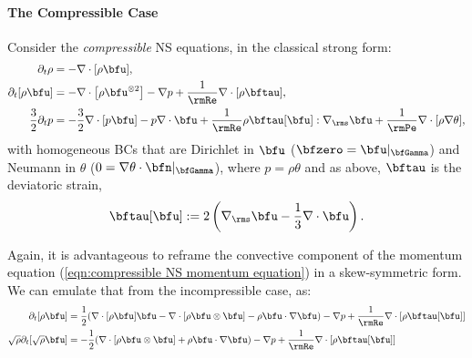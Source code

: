 \paragraph*{The Compressible Case}
    Consider the \emph{compressible} NS equations, in the classical strong form:
    \begin{align}
                \partial_{t}\rho  &=  - \nabla\cdot[\rho\bfu],  \label{eqn:compressible NS mass equation}  \\
          \partial_{t}[\rho\bfu]  &=  - \nabla\cdot\left[\rho\bfu^{\otimes 2}\right] - \nabla p + \frac{1}{\rmRe}\nabla\cdot[\rho\bftau],  \label{eqn:compressible NS momentum equation}  \\
        \frac{3}{2}\partial_{t}p  &=  - \frac{3}{2}\nabla\cdot[p\bfu] - p\nabla\cdot\bfu + \frac{1}{\rmRe}\rho\bftau[\bfu]:\nabla_{\rms}\bfu + \frac{1}{\rmPe}\nabla\cdot[\rho\nabla\theta],  \label{eqn:compressible NS energy equation}
    \end{align}
    with homogeneous BCs that are Dirichlet in $\bfu$ ($\bfzero  =  \bfu|_{\bfGamma}$) and Neumann in $\theta$ ($0  = 
     \nabla\theta\cdot\bfn|_{\bfGamma}$), where $p = \rho\theta$ and as above, $\bftau$ is the deviatoric strain,
    \begin{equation}
        \bftau[\bfu]  :=  2\left(\nabla_{\rms}\bfu - \frac{1}{3}\nabla\cdot\bfu\right).
    \end{equation}

    Again, it is advantageous to reframe the convective component of the momentum equation (\ref{eqn:compressible NS momentum equation}) in a skew-symmetric form. We can emulate that from the incompressible case, as:
    \begin{align}
        \partial_{t}[\rho\bfu]  &=  \frac{1}{2}(\nabla\cdot[\rho\bfu]\bfu - \nabla\cdot\left[\rho\bfu\otimes\bfu\right] - \rho\bfu\cdot\nabla\bfu) - \nabla p + \frac{1}{\rmRe}\nabla\cdot[\rho\bftau[\bfu]]  \\
        \sqrt{\rho}\partial_{t}[\sqrt{\rho}\bfu]  &=  - \frac{1}{2}(\nabla\cdot\left[\rho\bfu\otimes\bfu\right] + \rho\bfu\cdot\nabla\bfu) - \nabla p + \frac{1}{\rmRe}\nabla\cdot[\rho\bftau[\bfu]]  \label{eqn:compressible NS skew-symmetric momentum equation}  \\  
    \end{align}

